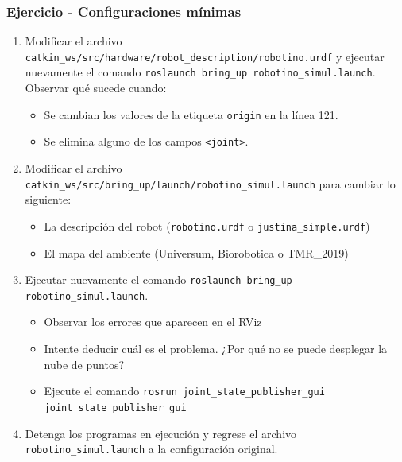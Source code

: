 \documentclass[10pt,spanish,aspectratio=1610]{beamer}
\begin{document}
\begin{frame}\frametitle{Ejercicio - Configuraciones mínimas}
  \begin{enumerate}
  \item Modificar el archivo \texttt{catkin\_ws/src/hardware/robot\_description/robotino.urdf} y ejecutar nuevamente el comando \texttt{roslaunch bring\_up robotino\_simul.launch}. Observar qué sucede cuando:
  \begin{itemize}
  \item Se cambian los valores de la etiqueta \texttt{origin} en la línea 121.
  \item Se elimina alguno de los campos \texttt{<joint>}.
  \end{itemize}
  \item Modificar el archivo \texttt{catkin\_ws/src/bring\_up/launch/robotino\_simul.launch} para cambiar lo siguiente:
  \begin{itemize}
  \item La descripción del robot (\texttt{robotino.urdf} o \texttt{justina\_simple.urdf})
  \item El mapa del ambiente (Universum, Biorobotica o TMR\_2019)
  \end{itemize}
  \item Ejecutar nuevamente el comando \texttt{roslaunch bring\_up robotino\_simul.launch}.
  \begin{itemize}
  \item Observar los errores que aparecen en el RViz
  \item Intente deducir cuál es el problema. ¿Por qué no se puede desplegar la nube de puntos?
  \item Ejecute el comando \texttt{rosrun joint\_state\_publisher\_gui joint\_state\_publisher\_gui}
  \end{itemize}
  \item Detenga los programas en ejecución y regrese el archivo \texttt{robotino\_simul.launch} a la configuración original.
\end{enumerate}
\end{frame}

\end{document}
